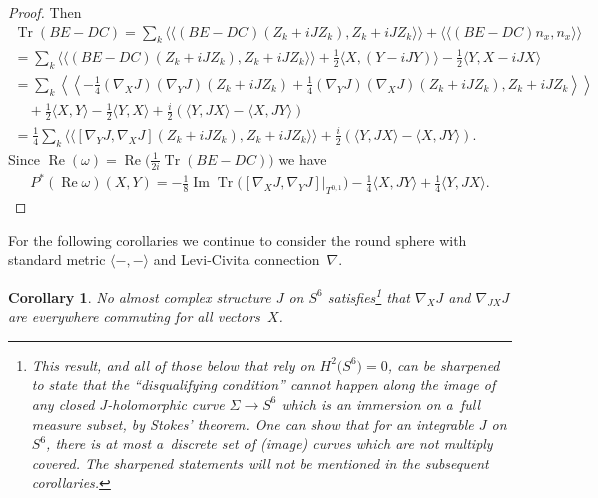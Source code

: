 \documentclass[10pt,a4paper]{amsart}
\DeclareMathOperator{\Tr}{Tr}
\newtheorem{cor}[thm]{Corollary}
\numberwithin{equation}{section}
\begin{document}
\begin{proof}
Then
\begin{gather*}
\Tr(BE-DC) = \sum_k \langle\langle (BE-DC) (Z_k + i J Z_k), Z_k + i J Z_k \rangle\rangle + \langle\langle (BE-DC)n_x,n_x \rangle\rangle \\
=\sum_k \langle\langle (BE-DC)( Z_k + i J Z_k), Z_k + i J Z_k \rangle\rangle + \frac 1 2 \langle X , (Y - i J Y) \rangle - \frac 1 2 \langle Y , X-iJX \rangle \\
= \sum_k \left\langle\left\langle -\frac{1}{4} (\nabla_X J) (\nabla_Y J)(Z_k + i J Z_k) +
\frac{1}{4} (\nabla_Y J) (\nabla_X J)(Z_k + i J Z_k)
, Z_k + i J Z_k \right\rangle\right\rangle \\
\quad{} + \frac 1 2 \langle X , Y\rangle - \frac 1 2 \langle Y , X \rangle + \frac i 2 ( \langle Y , JX \rangle - \langle X , JY \rangle ) \\
= \frac{1}{4} \sum_k \langle\langle [ \nabla_Y J , \nabla_X J ] (Z_k + i J Z_k)
, Z_k + i J Z_k \rangle\rangle + \frac i 2 ( \langle Y , JX \rangle - \langle X , JY \rangle ) .
\end{gather*}
Since $\operatorname{Re}(\omega) = \operatorname{Re} \big( \frac{1}{2i} \Tr(BE-DC)\big)$ we have
\begin{gather*}
 P^* (\operatorname{Re} \omega ) (X,Y)
= -\frac{1}{8} \operatorname{Im} \Tr \big( [ \nabla_X J , \nabla_Y J ] \big|_{T^{0,1}} \big)
 - \frac 1 4 \langle X,JY \rangle + \frac 1 4 \langle Y,JX \rangle. \tag*{\qed}
 \end{gather*}\renewcommand{\qed}{}
\end{proof}

For the following corollaries we continue to consider the round sphere with standard metric $\langle - ,- \rangle$ and Levi-Civita connection~$\nabla$.

\begin{cor} \label{cor;commute} No almost complex structure $J$ on $S^6$ satisfies\footnote{This result, and all of those below that rely on $H^2\big(S^6\big) = 0$, can be sharpened to state that the ``disqualifying condition'' cannot happen along the image of any closed $J$-holomorphic curve $\Sigma \to S^6$ which is an immersion on a~full measure subset, by Stokes' theorem. One can show that for an integrable $J$ on $S^6$, there is at most a~discrete set of (image) curves which are not multiply covered. The sharpened statements will not be mentioned in the subsequent corollaries.}
that $\nabla_X J$ and $\nabla_{JX} J$ are eve\-ry\-where commuting for all vectors~$X$.
\end{cor}
\end{document}
